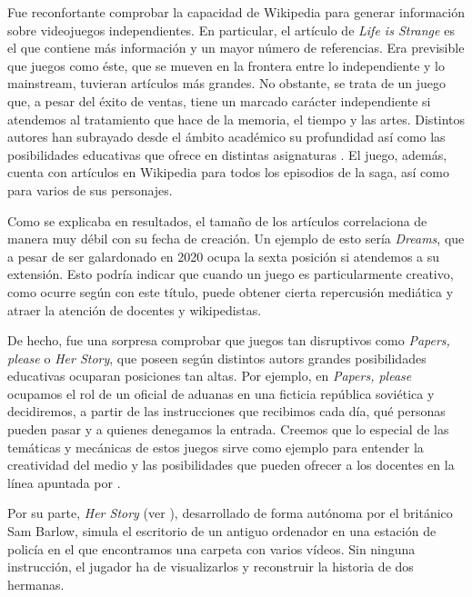 \documentclass[spanish]{textolivre}
\begin{document}
Fue reconfortante comprobar la capacidad de Wikipedia para generar información sobre videojuegos independientes. En particular, el artículo de \emph{Life is Strange} es el que contiene más información y un mayor número de referencias. Era previsible que juegos como éste, que se mueven en la frontera entre lo independiente y lo mainstream, tuvieran artículos más grandes. No obstante, se trata de un juego que, a pesar del éxito de ventas, tiene un marcado carácter independiente si atendemos al tratamiento que hace de la memoria, el tiempo y las artes. Distintos autores han subrayado desde el ámbito académico su profundidad \cite{de_miranda_life_2018} así como las posibilidades educativas que ofrece en distintas asignaturas \cite{cantano2019educacion}. El juego, además, cuenta con artículos en Wikipedia para todos los episodios de la saga, así como para varios de sus personajes.

Como se explicaba en resultados, el tamaño de los artículos correlaciona de manera muy débil con su fecha de creación. Un ejemplo de esto sería \emph{Dreams}, que a pesar de ser galardonado en 2020 ocupa la sexta posición si atendemos a su extensión. Esto podría indicar que cuando un juego es particularmente creativo, como ocurre según \textcite{heaven_how_2019} con este título, puede obtener cierta repercusión mediática y atraer la atención de docentes y wikipedistas.

De hecho, fue una sorpresa comprobar que juegos tan disruptivos como \emph{Papers, please} o \emph{Her Story}, que poseen según distintos autors grandes posibilidades educativas \cite{cabellos_pro-social_2022} ocuparan posiciones tan altas. Por ejemplo, en \emph{Papers, please} ocupamos el rol de un oficial de aduanas en una ficticia república soviética y decidiremos, a partir de las instrucciones que recibimos cada día, qué personas pueden pasar y a quienes denegamos la entrada. Creemos que lo especial de las temáticas y mecánicas de estos juegos sirve como ejemplo para entender la creatividad del medio y las posibilidades que pueden ofrecer a los docentes en la línea apuntada por \textcite{hanghoj2020computerspil}.

Por su parte, \emph{Her Story} (ver ), desarrollado de forma autónoma por el británico Sam Barlow, simula el escritorio de un antiguo ordenador en una estación de policía en el que encontramos una carpeta con varios vídeos. Sin ninguna instrucción, el jugador ha de visualizarlos y reconstruir la historia de dos hermanas.
\end{document}
